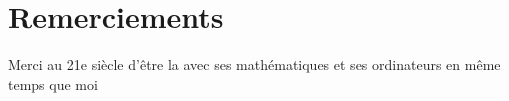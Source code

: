 \section*{Remerciements}


Merci au 21e siècle d'être la avec ses mathématiques et ses ordinateurs en même temps que moi
